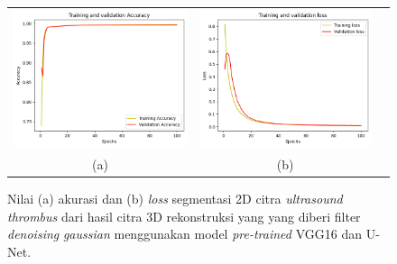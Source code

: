 \begin{enumerate}
	
	\begin{figure}[htbp]
		\centering
		\begin{tabular}{ccc}
			\includegraphics[scale=0.5]{bab4/Rekap Training/VGG16-UNet/gaussian/3/acc_99,63209629058838.png} &
			\includegraphics[scale=0.5]{bab4/Rekap Training/VGG16-UNet/gaussian/3/loss_0,0098.png} & \\
			(a) & (b)    %
		\end{tabular}
		\caption{Nilai (a) akurasi dan (b) \textit{loss} segmentasi 2D citra \textit{ultrasound} \textit{thrombus} dari hasil citra 3D rekonstruksi yang yang diberi filter \textit{denoising} \textit{gaussian} menggunakan model \textit{pre-trained} VGG16 dan U-Net.}
		\label{fig:performance-gaussian-vggunet-rekonstruksi}
	\end{figure}
	

\end{enumerate}
